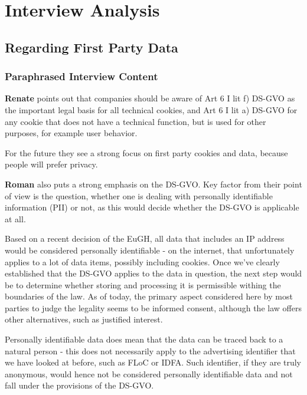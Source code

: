 %
%

\pagebreak
\section{Interview Analysis}

\onehalfspacing

\subsection{Regarding First Party Data}

\subsubsection{Paraphrased Interview Content}

\textbf{Renate} points out that companies should be aware of Art 6 I lit f) DS-GVO as the important legal basis for all technical cookies, and Art 6 I lit a) DS-GVO for any cookie that does not have a technical function, but is used for other purposes, for example user behavior.

For the future they see a strong focus on first party cookies and data, because people will prefer privacy.

\textbf{Roman} also puts a strong emphasis on the DS-GVO. Key factor from their point of view is the question, whether one is dealing with personally identifiable information (PII) or not, as this would decide whether the DS-GVO is applicable at all. 

Based on a recent decision of the EuGH, all data that includes an IP address would be considered personally identifiable - on the internet, that unfortunately applies to a lot of data items, possibly including cookies. Once we've clearly established that the DS-GVO applies to the data in question, the next step would be to determine whether storing and processing it is permissible withing the boundaries of the law. As of today, the primary aspect considered here by most parties to judge the legality seems to be informed consent, although the law offers other alternatives, such as justified interest.

Personally identifiable data does mean that the data can be traced back to a natural person - this does not necessarily apply to the advertising identifier that we have looked at before, such as FLoC or IDFA. Such identifier, if they are truly anonymous, would hence not be considered personally identifiable data and not fall under the provisions of the DS-GVO.

